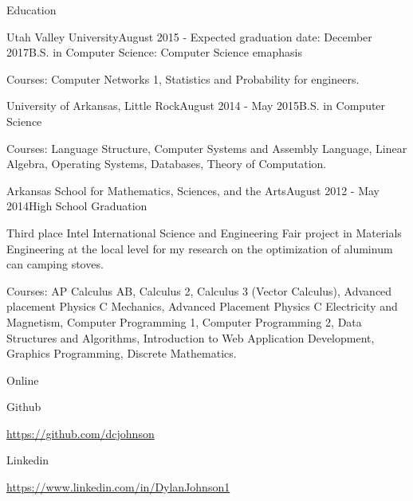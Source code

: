 \documentclass{resume} %
\begin{document}

\begin{rSection}{Education}

\begin{rSubsection}{Utah Valley University}{August 2015 - Expected graduation date: December 2017}{B.S. in Computer Science: Computer Science emaphasis}
	\item Courses: Computer Networks 1, Statistics and Probability for engineers.
\end{rSubsection}

\begin{rSubsection}{University of Arkansas, Little Rock}{August 2014 - May 2015}{B.S. in Computer Science}
	\item Courses: Language Structure, Computer Systems and Assembly Language, Linear Algebra, Operating Systems, Databases, Theory of Computation.
\end{rSubsection}

\begin{rSubsection}{Arkansas School for Mathematics, Sciences, and the Arts}{August 2012 - May 2014}{High School Graduation}
	\item Third place Intel International Science and Engineering Fair project in Materials Engineering at the local level for my research on the optimization of aluminum can camping stoves.
	\item Courses: AP Calculus AB, Calculus 2, Calculus 3 (Vector Calculus), Advanced placement Physics C Mechanics, Advanced Placement Physics C Electricity and Magnetism, Computer Programming 1, Computer Programming 2, Data Structures and Algorithms, Introduction to Web Application Development, Graphics Programming, Discrete Mathematics.
\end{rSubsection}

\end{rSection}

\begin{rSection}{Online}

\begin{rSubsection}{Github}{}{}{}
	\item {\href{https://github.com/dcjohnson}{https://github.com/dcjohnson}}
\end{rSubsection}

\begin{rSubsection}{Linkedin}{}{}{}
	\item {\href{https://www.linkedin.com/in/DylanJohnson1}{https://www.linkedin.com/in/DylanJohnson1}}
\end{rSubsection}

\end{rSection}
\end{document}
